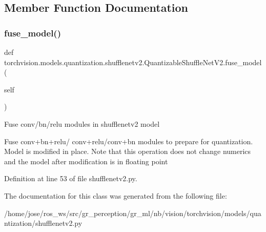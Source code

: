\subsection{Member Function Documentation}
\mbox{\label{classtorchvision_1_1models_1_1quantization_1_1shufflenetv2_1_1QuantizableShuffleNetV2_a63bec221f4e8efd09d8910d1387fa58b}} 
\subsubsection{\texorpdfstring{fuse\+\_\+model()}{fuse\_model()}}
{\footnotesize\ttfamily def torchvision.\+models.\+quantization.\+shufflenetv2.\+Quantizable\+Shuffle\+Net\+V2.\+fuse\+\_\+model (\begin{DoxyParamCaption}\item[{}]{self }\end{DoxyParamCaption})}

\begin{DoxyVerb}Fuse conv/bn/relu modules in shufflenetv2 model

Fuse conv+bn+relu/ conv+relu/conv+bn modules to prepare for quantization.
Model is modified in place.  Note that this operation does not change numerics
and the model after modification is in floating point
\end{DoxyVerb}
 

Definition at line 53 of file shufflenetv2.\+py.



The documentation for this class was generated from the following file\+:\begin{DoxyCompactItemize}
\item 
/home/jose/ros\+\_\+ws/src/gr\+\_\+perception/gr\+\_\+ml/nb/vision/torchvision/models/quantization/shufflenetv2.\+py\end{DoxyCompactItemize}

